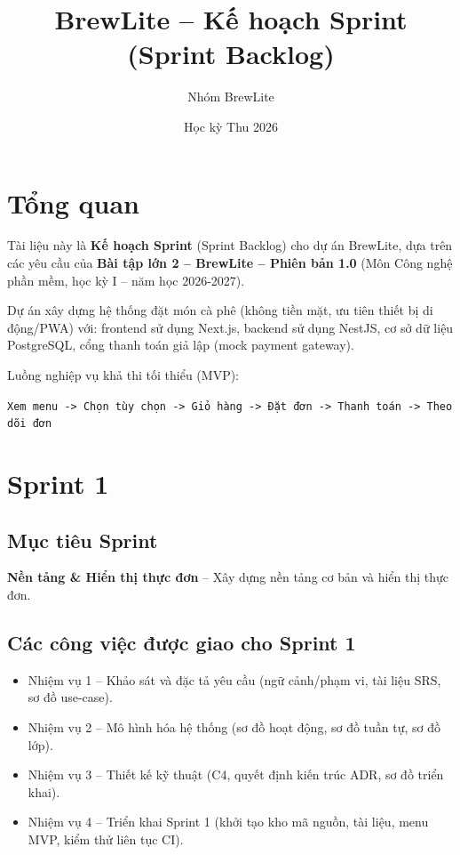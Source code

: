 \documentclass[12pt, a4paper]{article}
\title{\textbf{BrewLite -- Kế hoạch Sprint (Sprint Backlog)}}
\author{Nhóm BrewLite}
\date{Học kỳ Thu 2026}
\begin{document}
\maketitle

\section{Tổng quan}
Tài liệu này là \textbf{Kế hoạch Sprint} (Sprint Backlog) cho dự án BrewLite, dựa trên các yêu cầu của \textbf{Bài tập lớn 2 -- BrewLite -- Phiên bản 1.0} (Môn Công nghệ phần mềm, học kỳ I -- năm học 2026-2027).

Dự án xây dựng hệ thống đặt món cà phê (không tiền mặt, ưu tiên thiết bị di động/PWA) với:
frontend sử dụng Next.js, backend sử dụng NestJS, cơ sở dữ liệu PostgreSQL, cổng thanh toán giả lập (mock payment gateway).

Luồng nghiệp vụ khả thi tối thiểu (MVP):
\begin{center}
\texttt{Xem menu -> Chọn tùy chọn -> Giỏ hàng -> Đặt đơn -> Thanh toán -> Theo dõi đơn}
\end{center}

\section{Sprint 1}
\label{sec:sprint1}

\subsection{Mục tiêu Sprint}
\textbf{Nền tảng \& Hiển thị thực đơn} -- Xây dựng nền tảng cơ bản và hiển thị thực đơn.

\subsection{Các công việc được giao cho Sprint 1}
\begin{itemize}
  \item Nhiệm vụ 1 -- Khảo sát và đặc tả yêu cầu (ngữ cảnh/phạm vi, tài liệu SRS, sơ đồ use-case).
  \item Nhiệm vụ 2 -- Mô hình hóa hệ thống (sơ đồ hoạt động, sơ đồ tuần tự, sơ đồ lớp).
  \item Nhiệm vụ 3 -- Thiết kế kỹ thuật (C4, quyết định kiến trúc ADR, sơ đồ triển khai).
  \item Nhiệm vụ 4 -- Triển khai Sprint 1 (khởi tạo kho mã nguồn, tài liệu, menu MVP, kiểm thử liên tục CI).
\end{itemize}
\end{document}
